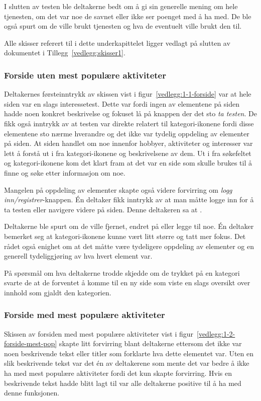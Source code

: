I slutten av testen ble deltakerne bedt om å gi sin generelle mening om hele tjenesten, om det var noe de savnet eller ikke ser poenget med å ha med. De ble også spurt om de ville brukt tjenesten og hva de eventuelt ville brukt den til.

Alle skisser referert til i dette underkapittelet ligger vedlagt på slutten av dokumentet i Tillegg~\ref{vedlegg:skisser1}.



\subsubsection{Forside uten mest populære aktiviteter}
\label{section:test-forside-1.0}
Deltakernes førsteinntrykk av skissen vist i figur~\ref{vedlegg:1-1-forside} var at hele siden var en slags interessetest. Dette var fordi ingen av elementene på siden hadde noen konkret beskrivelse og fokuset lå på knappen der det sto {\em  ta testen}. De fikk også inntrykk av at testen var direkte relatert til kategori-ikonene fordi disse elementene sto nærme hverandre og det ikke var tydelig oppdeling av elementer på siden. At siden handlet om noe innenfor hobbyer, aktiviteter og interesser var lett å forstå ut i fra kategori-ikonene og beskrivelsene av dem. Ut i fra søkefeltet og kategori-ikonene kom det klart fram at det var en side som skulle brukes til å finne og søke etter informasjon om noe. 

Mangelen på oppdeling av elementer skapte også videre forvirring om {\em  logg inn/registrer}-knappen. Én deltaker fikk inntrykk av at man måtte logge inn for å ta testen eller navigere videre på siden. Denne deltakeren sa at .

Deltakerne ble spurt om de ville fjernet, endret på eller legge til noe. Én deltaker bemerket seg at kategori-ikonene kunne vært litt større og tatt mer fokus. Det rådet også enighet om at det måtte være tydeligere oppdeling av elementer og en generell tydeliggjøring av hva hvert element var.

På spørsmål om hva deltakerne trodde skjedde om de trykket på en kategori svarte de at de forventet å komme til en ny side som viste en slags oversikt over innhold som gjaldt den kategorien.

\subsubsection{Forside med mest populære aktiviteter}
Skissen av forsiden med mest populære aktiviteter vist i figur~\ref{vedlegg:1-2-forside-mest-pop} skapte litt forvirring blant deltakerne ettersom det ikke var noen beskrivende tekst eller titler som forklarte hva dette elementet var. Uten en slik beskrivende tekst var det én av deltakerene som mente det var bedre å ikke ha med mest populære aktiviteter fordi det kun skapte forvirring. Hvis en beskrivende tekst hadde blitt lagt til var alle deltakerne positive til å ha med denne funksjonen. 

